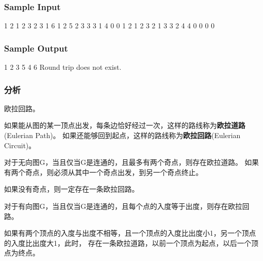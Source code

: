\subsubsection{Sample Input}
\begin{Code}
1 2 1
2 3 2
3 1 6
1 2 5
2 3 3
3 1 4
0 0
1 2 1
2 3 2
1 3 3
2 4 4
0 0
0 0
\end{Code}

\subsubsection{Sample Output}
\begin{Code}
1 2 3 5 4 6 
Round trip does not exist.
\end{Code}

\subsubsection{分析}
欧拉回路。

如果能从图的某一顶点出发，每条边恰好经过一次，这样的路线称为\textbf{欧拉道路}(Eulerian Path)。
如果还能够回到起点，这样的路线称为\textbf{欧拉回路}(Eulerian Circuit)。

对于无向图G，当且仅当G是连通的，且最多有两个奇点，则存在欧拉道路。
如果有两个奇点，则必须从其中一个奇点出发，到另一个奇点终止。

如果没有奇点，则一定存在一条欧拉回路。

对于有向图G，当且仅当G是连通的，且每个点的入度等于出度，则存在欧拉回路。

如果有两个顶点的入度与出度不相等，且一个顶点的入度比出度小1，另一个顶点的入度比出度大1，此时，
存在一条欧拉道路，以前一个顶点为起点，以后一个顶点为终点。


